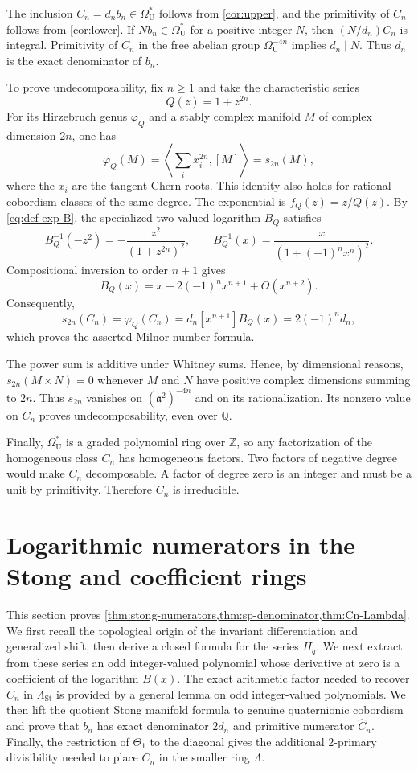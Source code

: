 \documentclass[14pt,dvipsnames]{extarticle}
\makeatletter
\numberwithin{equation}{subsection}
\theoremstyle{plain}
\theoremstyle{definition}
\theoremstyle{definition}
\renewenvironment{proof}[1][\proofname]{
 \par\pushQED{\qed}\normalfont
 \topsep6\p@\@plus6\p@\relax
 \trivlist\item[\hskip\labelsep\bfseries\itshape #1\@addpunct{.}]
}{\popQED\endtrivlist\@endpefalse}
\newcommand{\OmU}{\Omega_{\mathrm U}^{\ast}}
\newcommand{\Uu}{\mathrm{U}}
\newcommand{\LambdaSt}{\Lambda_{\mathrm{St}}}
\makeatother
\begin{document}
\begin{proof}[Proof of \cref{thm:main}]
The inclusion $C_n=d_nb_n\in\OmU$ follows from \cref{cor:upper}, and the
primitivity of $C_n$ follows from \cref{cor:lower}. If $Nb_n\in\OmU$ for a
positive integer $N$, then
$(N/d_n)C_n$ is integral. Primitivity of $C_n$ in the free abelian group
$\Omega_{\Uu}^{-4n}$ implies $d_n\mid N$. Thus $d_n$ is the exact denominator
of $b_n$.

To prove undecomposability, fix $n\geq1$ and take the characteristic series
\[
 Q(z)=1+z^{2n}.
\]
For its Hirzebruch genus $\varphi_Q$ and a stably complex manifold $M$ of
complex dimension $2n$, one has
\[
 \varphi_Q(M)
 =\left\langle\sum_i x_i^{2n},[M]\right\rangle
 =s_{2n}(M),
\]
where the $x_i$ are the tangent Chern roots. This identity also holds for
rational cobordism classes of the same degree. The exponential is
$f_Q(z)=z/Q(z)$. By \eqref{eq:def-exp-B}, the specialized two-valued
logarithm $B_Q$ satisfies
\[
 B_Q^{-1}(-z^2)=-\frac{z^2}{(1+z^{2n})^2},
 \qquad
 B_Q^{-1}(x)=\frac{x}{(1+(-1)^n x^n)^2}.
\]
Compositional inversion to order $n+1$ gives
\[
 B_Q(x)=x+2(-1)^n x^{n+1}+O(x^{n+2}).
\]
Consequently,
\[
 s_{2n}(C_n)=\varphi_Q(C_n)
 =d_n[x^{n+1}]B_Q(x)=2(-1)^n d_n,
\]
which proves the asserted Milnor number formula.

The power sum is additive under Whitney sums. Hence, by dimensional
reasons, $s_{2n}(M\times N)=0$ whenever $M$ and $N$ have positive complex
dimensions summing to $2n$. Thus $s_{2n}$ vanishes on
$(\mathfrak a^2)^{-4n}$ and on its rationalization. Its nonzero value on
$C_n$ proves undecomposability, even over $\mathbb Q$.

Finally, $\OmU$ is a graded polynomial ring over $\mathbb Z$, so any
factorization of the homogeneous class $C_n$ has homogeneous factors. Two
factors of negative degree would make $C_n$ decomposable. A factor of
degree zero is an integer and must be a unit by primitivity. Therefore
$C_n$ is irreducible.
\end{proof}






\section{Logarithmic numerators in the Stong and coefficient rings}
\label{sec:stong-numerators}

This section proves
\cref{thm:stong-numerators,thm:sp-denominator,thm:Cn-Lambda}. We first recall
the topological origin of the invariant differentiation and generalized shift,
then derive a closed formula for the series $H_q$. We next extract from these
series an odd integer-valued polynomial whose derivative at zero is a
coefficient of the logarithm $B(x)$. The exact arithmetic factor needed to
recover $C_n$ in $\LambdaSt$ is provided by a general lemma on odd
integer-valued polynomials. We then lift the quotient Stong manifold formula
to genuine quaternionic cobordism and prove that $\widetilde b_n$ has exact
denominator $2d_n$ and primitive numerator $\widehat C_n$.
Finally, the restriction of $\Theta_1$ to the diagonal gives the additional
$2$-primary divisibility needed to place $C_n$ in the smaller ring $\Lambda$.
\end{document}
